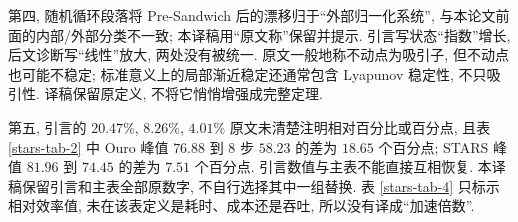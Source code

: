 第四, 随机循环段落将 Pre-Sandwich 后的漂移归于“外部归一化系统”, 与本论文前面的内部/外部分类不一致; 本译稿用“原文称”保留并提示. 引言写状态“指数”增长, 后文诊断写“线性”放大, 两处没有被统一. 原文一般地称不动点为吸引子, 但不动点也可能不稳定; 标准意义上的局部渐近稳定还通常包含 Lyapunov 稳定性, 不只吸引性. 译稿保留原定义, 不将它悄悄增强成完整定理.

第五, 引言的 $20.47\%$, $8.26\%$, $4.01\%$ 原文未清楚注明相对百分比或百分点, 且表 \ref{stars-tab-2} 中 Ouro 峰值 $76.88$ 到 8 步 $58.23$ 的差为 $18.65$ 个百分点; STARS 峰值 $81.96$ 到 $74.45$ 的差为 $7.51$ 个百分点. 引言数值与主表不能直接互相恢复. 本译稿保留引言和主表全部原数字, 不自行选择其中一组替换. 表 \ref{stars-tab-4} 只标示相对效率值, 未在该表定义是耗时、成本还是吞吐, 所以没有译成“加速倍数”.


